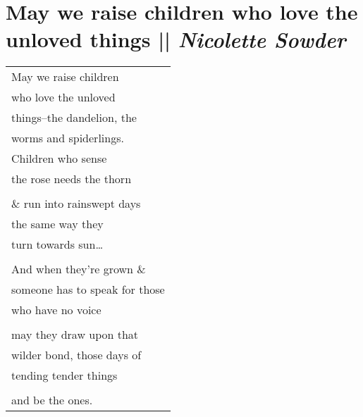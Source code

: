 
\section[May we raise children who love the unloved things]{May we raise children who love the unloved things || \emph{Nicolette Sowder} \hspace*{\fill}  \thepage}
\vspace*{1.5cm}
\begin{center}
\begin{tabular}{l}
May we raise children\\
who love the unloved\\
things–the dandelion, the\\
worms and spiderlings.\\
Children who sense\\
the rose needs the thorn\\

\\\& run into rainswept days\\
the same way they\\
turn towards sun…\\

\\And when they’re grown \&\\
someone has to speak for those\\
who have no voice\\

\\may they draw upon that\\
wilder bond, those days of\\
tending tender things\\

\\and be the ones.
\end{tabular}
\end{center}